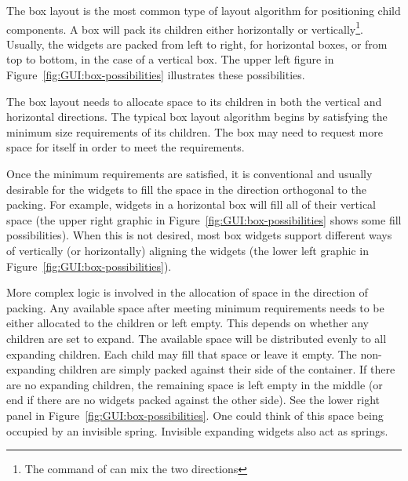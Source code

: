 The box layout is the most common type of layout algorithm for
positioning child components. A box will pack its children either
horizontally or vertically\footnote{The  command of
   can mix the two directions}. Usually, the widgets are
packed from left to right, for horizontal boxes, or from top to
bottom, in the case of a vertical box.  The upper left figure in
Figure~\ref{fig:GUI:box-possibilities} illustrates these possibilities.

The box layout needs to allocate space to its children in both the
vertical and horizontal directions. The typical box layout algorithm
begins by satisfying the minimum size requirements of its
children. The box may need to request more space for itself in order
to meet the requirements. 

Once the minimum requirements are satisfied, it is conventional and
usually desirable for the widgets to fill the space in the direction
orthogonal to the packing. For example, widgets in a horizontal box
will fill all of their vertical space (the upper right graphic in
Figure~\ref{fig:GUI:box-possibilities} shows some fill
possibilities). When this is not desired, most box widgets support
different ways of vertically (or horizontally) aligning the widgets
(the lower left graphic in Figure~\ref{fig:GUI:box-possibilities}).

More complex logic is involved in the allocation of space in the
direction of packing. Any available space after meeting minimum
requirements needs to be either allocated to the children or left
empty. This depends on whether any children are set to expand. The
available space will be distributed evenly to all expanding
children. Each child may fill that space or leave it empty. The
non-expanding children are simply packed against their
side of the container. If there are no expanding children, the
remaining space is left empty in the middle (or end if there are no
widgets packed against the other side). See the lower right
panel in Figure~\ref{fig:GUI:box-possibilities}. One could think
of this space being occupied by an invisible spring. Invisible
expanding widgets also act as springs.


